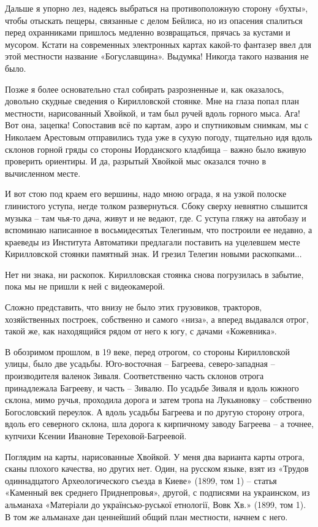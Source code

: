 Дальше я упорно лез, надеясь выбраться на противоположную сторону «бухты», чтобы отыскать пещеры, связанные с делом Бейлиса, но из опасения спалиться перед охранниками пришлось медленно возвращаться, прячась за кустами и мусором. Кстати на современных электронных картах какой-то фантазер ввел для этой местности название «Богуславщина». Выдумка! Никогда такого названия не было.
 
Позже я более основательно стал собирать разрозненные и, как оказалось, довольно скудные сведения о Кирилловской стоянке. Мне на глаза попал план местности, нарисованный Хвойкой, и там был ручей вдоль горного мыса. Ага! Вот она, зацепка! Сопоставив всё по картам, аэро и спутниковым снимкам, мы с Николаем Арестовым отправились туда уже в сухую погоду, тщательно идя вдоль склонов горной гряды со стороны Иорданского кладбища – важно было вживую проверить ориентиры. И да, разрытый Хвойкой мыс оказался точно в вычисленном месте.

И вот стою под краем его вершины, надо мною ограда, я на узкой полоске глинистого уступа, негде толком развернуться. Сбоку сверху невнятно слышится музыка – там чья-то дача, живут и не ведают, где. С уступа гляжу на автобазу и вспоминаю написанное в восьмидесятых Телегиным, что построили ее недавно, а краеведы из Института Автоматики предлагали поставить на уцелевшем месте Кирилловской стоянки памятный знак. И грезил Телегин новыми раскопками... 
 
Нет ни знака, ни раскопок. Кирилловская стоянка снова погрузилась в забытие, пока мы не пришли к ней с видеокамерой.

Сложно представить, что внизу не было этих грузовиков, тракторов, хозяйственных построек, собственно и самого «низа», а вперед выдавался отрог, такой же, как находящийся рядом от него к югу, с дачами «Кожевника».

В обозримом прошлом, в 19 веке, перед отрогом, со стороны Кирилловской улицы, было две усадьбы. Юго-восточная – Багреева, северо-западная – производителя валенок Зиваля. Соответственно часть склонов отрога принадлежала Багрееву, и часть – Зивалю. По усадьбе Зиваля и вдоль южного склона, мимо ручья, проходила дорога и затем  тропа на Лукьяновку – собственно Богословский переулок. А вдоль усадьбы Багреева и по другую сторону отрога, вдоль его северного склона, шла дорога к кирпичному заводу Багреева – а точнее, купчихи Ксении Ивановне Тереховой-Багреевой.

Поглядим на карты, нарисованные Хвойкой. У меня два варианта карты отрога, сканы плохого качества, но других нет. Один, на русском языке, взят из «Трудов одиннадцатого Археологического съезда в Киеве» (1899, том 1) – статья «Каменный век среднего Приднепровья», другой, с подписями на украинском, из альманаха «Матеріали до українсько-руської етнології, Вовк Хв.» (1899, том 1). В том же альманахе дан ценнейший общий план местности, начнем с него.

